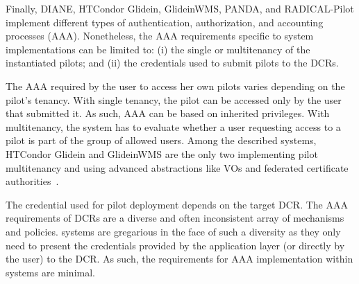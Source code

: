 \documentclass{sig-alternate}
\begin{document}

Finally, DIANE, HTCondor Glidein, GlideinWMS, PANDA, and RADICAL-Pilot implement
different types of authentication, authorization, and accounting processes
(AAA). Nonetheless, the AAA requirements specific to \pilot system
implementations can be limited to: (i) the single or multitenancy of the
instantiated pilots; and (ii) the credentials used to submit pilots to the DCRs.

The AAA required by the user to access her own pilots varies depending on the
pilot's tenancy. With single tenancy, the pilot can be accessed only by the user
that submitted it. As such, AAA can be based on inherited privileges. With
multitenancy, the \pilot system has to evaluate whether a user requesting access
to a pilot is part of the group of allowed users. Among the described \pilot
systems, HTCondor Glidein and GlideinWMS are the only two implementing pilot
multitenancy and using advanced abstractions like VOs and federated certificate
authorities~\cite{horwitz2002}.

The credential used for pilot deployment depends on the target DCR. The AAA
requirements of DCRs are a diverse and often inconsistent array of mechanisms
and policies. \pilot systems are gregarious in the face of such a diversity as
they only need to present the credentials provided by the application layer (or
directly by the user) to the DCR. As such, the requirements for AAA
implementation within \pilot systems are minimal.


%



\end{document}
